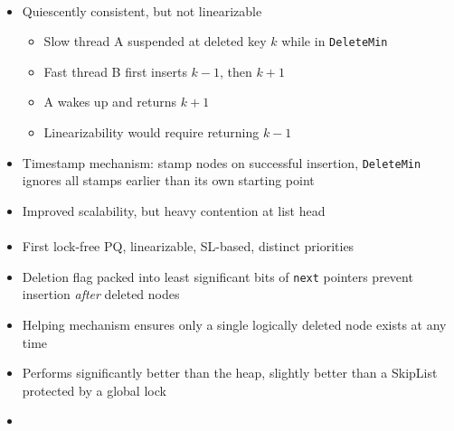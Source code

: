 \documentclass[usenames,dvipsnames]{beamer}
\begin{document}
\begin{frame}{}
\framesubtitle{\citeauthor{shavit2000skiplist}}

\begin{itemize}
\item Quiescently consistent, but not linearizable
    \begin{itemize}
    \item Slow thread A suspended at deleted key $k$ while in \lstinline|DeleteMin|
    \item Fast thread B first inserts $k-1$, then $k+1$
    \item A wakes up and returns $k+1$
    \item Linearizability would require returning $k-1$
    \end{itemize}

\item Timestamp mechanism: stamp nodes on successful insertion,
      \lstinline|DeleteMin| ignores all stamps earlier than its own starting point
\item Improved scalability, but heavy contention at list head
\end{itemize}
\end{frame}

\begin{frame}{}
\framesubtitle{\citeauthor{sundell2003fast}}

\begin{itemize}
\item First lock-free \ac{PQ}, linearizable, \ac{SL}-based, distinct priorities
\item Deletion flag packed into least significant bits of \lstinline|next| pointers
      prevent insertion \emph{after} deleted nodes
\item Helping mechanism ensures only a single logically deleted node exists at any time
\item Performs significantly better than the \citeauthor{hunt1996efficient} heap, slightly better
      than a SkipList protected by a global lock
\item {}
\end{itemize}
\end{frame}
\end{document}
